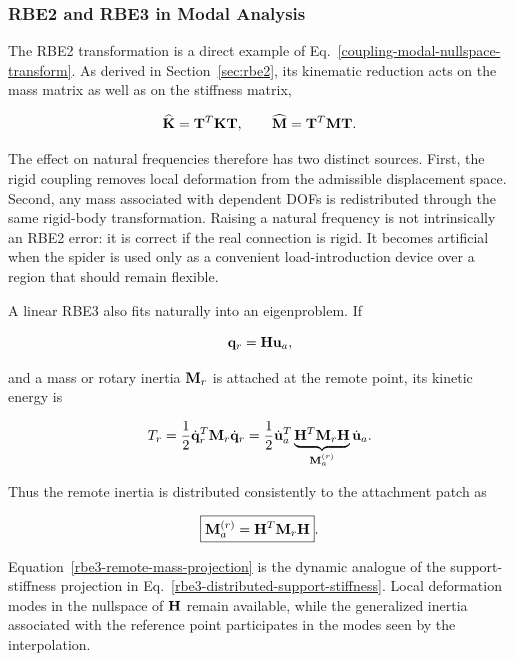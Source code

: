 \subsubsection{RBE2 and RBE3 in Modal Analysis}

The RBE2 transformation is a direct example of
Eq.~\eqref{coupling-modal-nullspace-transform}. As derived in
Section~\ref{sec:rbe2}, its kinematic reduction acts on the mass matrix as well
as on the stiffness matrix,

\begin{equation}
    \widehat{\mathbf{K}}=\mathbf{T}^{T}\mathbf{K}\mathbf{T},
    \qquad
    \widehat{\mathbf{M}}=\mathbf{T}^{T}\mathbf{M}\mathbf{T}.
\end{equation}

The effect on natural frequencies therefore has two distinct sources. First,
the rigid coupling removes local deformation from the admissible displacement
space. Second, any mass associated with dependent DOFs is redistributed through
the same rigid-body transformation. Raising a natural frequency is not
intrinsically an RBE2 error: it is correct if the real connection is rigid. It
becomes artificial when the spider is used only as a convenient load-introduction
device over a region that should remain flexible.

A linear RBE3 also fits naturally into an eigenproblem. If

\begin{equation}
    \mathbf{q}_r=\mathbf{H}\mathbf{u}_a,
\end{equation}

and a mass or rotary inertia $\mathbf{M}_r$ is attached at the remote point, its
kinetic energy is

\begin{equation}
    T_r
    =\frac{1}{2}\dot{\mathbf{q}}_r^T\mathbf{M}_r\dot{\mathbf{q}}_r
    =\frac{1}{2}\dot{\mathbf{u}}_a^T
    \underbrace{\mathbf{H}^T\mathbf{M}_r\mathbf{H}}_{\mathbf{M}_a^{(r)}}
    \dot{\mathbf{u}}_a.
\end{equation}

Thus the remote inertia is distributed consistently to the attachment patch as

\begin{equation}\label{rbe3-remote-mass-projection}
    \boxed{\mathbf{M}_a^{(r)}=\mathbf{H}^{T}\mathbf{M}_r\mathbf{H}}.
\end{equation}

Equation~\eqref{rbe3-remote-mass-projection} is the dynamic analogue of the
support-stiffness projection in
Eq.~\eqref{rbe3-distributed-support-stiffness}. Local deformation modes in the
nullspace of $\mathbf{H}$ remain available, while the generalized inertia associated
with the reference point participates in the modes seen by the interpolation.

